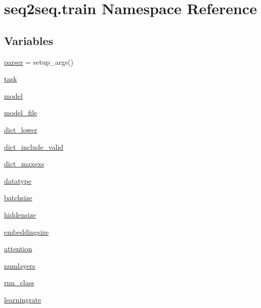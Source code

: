 \hypertarget{namespaceseq2seq_1_1train}{}\section{seq2seq.\+train Namespace Reference}
\label{namespaceseq2seq_1_1train}
\subsection*{Variables}
\begin{DoxyCompactItemize}
\item 
\hyperlink{namespaceseq2seq_1_1train_ae0c077888f9eec1c89d0ac716b9d3c1d}{parser} = setup\+\_\+args()
\item 
\hyperlink{namespaceseq2seq_1_1train_aad6c776ac41bc888156753ef89496f09}{task}
\item 
\hyperlink{namespaceseq2seq_1_1train_a9146f4103ac43d9597ce833452cd90de}{model}
\item 
\hyperlink{namespaceseq2seq_1_1train_af769014804078bfb1203fbb8933f30ab}{model\+\_\+file}
\item 
\hyperlink{namespaceseq2seq_1_1train_a8ae37a9957756f117e8067c0b2eddba2}{dict\+\_\+lower}
\item 
\hyperlink{namespaceseq2seq_1_1train_a89bd6d6d0e3d331cbe9542c898bb634b}{dict\+\_\+include\+\_\+valid}
\item 
\hyperlink{namespaceseq2seq_1_1train_a36b7b67a3c84414eb6e758a58ad85a9b}{dict\+\_\+maxexs}
\item 
\hyperlink{namespaceseq2seq_1_1train_ab86023e033ed77502998ea712060a9ba}{datatype}
\item 
\hyperlink{namespaceseq2seq_1_1train_aa65c405e99f9d4444f67384885904c09}{batchsize}
\item 
\hyperlink{namespaceseq2seq_1_1train_ada8e559677887832ea3082b28275be1e}{hiddensize}
\item 
\hyperlink{namespaceseq2seq_1_1train_aa75e740b92949753f03b6f8a886b4722}{embeddingsize}
\item 
\hyperlink{namespaceseq2seq_1_1train_a9fe719271e349a4677bcd56cfa75f9dc}{attention}
\item 
\hyperlink{namespaceseq2seq_1_1train_a769b0fdbeb293c1f1b52cf20306b7307}{numlayers}
\item 
\hyperlink{namespaceseq2seq_1_1train_a46177da1cc74c4a2874e4a527d857f75}{rnn\+\_\+class}
\item 
\hyperlink{namespaceseq2seq_1_1train_acfa2ba94133a4b583eb2450fb2efc93a}{learningrate}
\item 

\end{DoxyCompactItemize}
